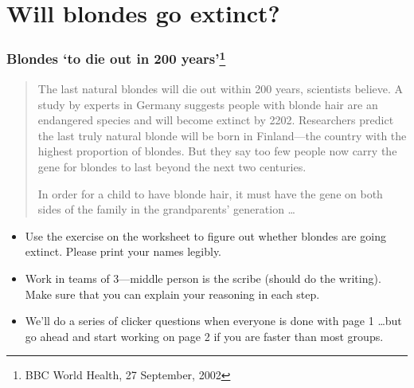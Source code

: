 \section{Will blondes go extinct?}



\begin{noheadline}
\begin{frame}[t]
    \frametitle{Blondes `to die out in 200 years'\footnote{BBC World Health, 27 September, 2002}}
    \begin{adjustwidth}{-1.5em}{-1.5em}
        \begin{quote}
            The last natural blondes will die out within 200 years, scientists
            believe.  A study by experts in Germany suggests people with blonde
            hair are an endangered species and will become extinct by 2202.
            Researchers predict the last truly natural blonde will be born in
            Finland---the country with the highest proportion of blondes.  But
            they say too few people now carry the gene for blondes to last
            beyond the next two centuries.

            \vspace{4mm}
              In order for a child to have blonde hair, it must have
            the gene on both sides of the family in the grandparents'
            generation \ldots
        \end{quote}

    \end{adjustwidth}
\end{frame}
\end{noheadline}

\begin{noheadline}
\begin{frame}[t]
    \begin{adjustwidth}{-1.5em}{-1.5em}

        \begin{itemize}
            \item Use the exercise on the worksheet to figure out whether
                blondes are going extinct. Please print your names legibly. 

                \vspace{1cm}
            \item Work in teams of 3---middle person is the scribe (should do the
                writing).  Make sure that you can explain your reasoning in
                each step. 

                \vspace{1cm}
            \item We'll do a series of clicker questions when everyone is done
                with page 1 \ldots but go ahead and start working on page 2 if
                you are faster than most groups. 
        \end{itemize}
    \end{adjustwidth}
\end{frame}
\end{noheadline}

